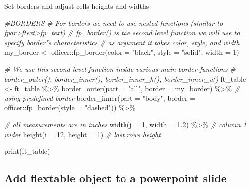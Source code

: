 \documentclass[
]{book}
\newenvironment{Shaded}{\begin{snugshade}}{\end{snugshade}}
\newcommand{\AttributeTok}[1]{\textcolor[rgb]{0.77,0.63,0.00}{#1}}
\newcommand{\CommentTok}[1]{\textcolor[rgb]{0.56,0.35,0.01}{\textit{#1}}}
\newcommand{\DecValTok}[1]{\textcolor[rgb]{0.00,0.00,0.81}{#1}}
\newcommand{\FloatTok}[1]{\textcolor[rgb]{0.00,0.00,0.81}{#1}}
\newcommand{\FunctionTok}[1]{\textcolor[rgb]{0.00,0.00,0.00}{#1}}
\newcommand{\NormalTok}[1]{#1}
\newcommand{\OtherTok}[1]{\textcolor[rgb]{0.56,0.35,0.01}{#1}}
\newcommand{\SpecialCharTok}[1]{\textcolor[rgb]{0.00,0.00,0.00}{#1}}
\newcommand{\StringTok}[1]{\textcolor[rgb]{0.31,0.60,0.02}{#1}}
\begin{document}
Set borders and adjust cells heights and widths

\begin{Shaded}
\begin{Highlighting}[]
\CommentTok{\#BORDERS}
\CommentTok{\# For borders we need to use nested functions (similar to fpar\textgreater{}ftext\textgreater{}fp\_text)}
\CommentTok{\# fp\_border() is the second level function we will use to specify border"s characteristics}
\CommentTok{\# as argument it takes color, style, and width}
\NormalTok{my\_border }\OtherTok{\textless{}{-}}\NormalTok{ officer}\SpecialCharTok{::}\FunctionTok{fp\_border}\NormalTok{(}\AttributeTok{color =} \StringTok{"black"}\NormalTok{, }\AttributeTok{style =} \StringTok{"solid"}\NormalTok{, }\AttributeTok{width =} \DecValTok{1}\NormalTok{)}

\CommentTok{\# We use this second level function inside various main border functions}
\CommentTok{\# border\_outer(), border\_inner(), border\_inner\_h(), border\_inner\_v()}
\NormalTok{ft\_table }\OtherTok{\textless{}{-}}\NormalTok{ ft\_table }\SpecialCharTok{\%\textgreater{}\%}
  \FunctionTok{border\_outer}\NormalTok{(}\AttributeTok{part =} \StringTok{"all"}\NormalTok{, }\AttributeTok{border =}\NormalTok{ my\_border) }\SpecialCharTok{\%\textgreater{}\%} \CommentTok{\# using predefined border}
  \FunctionTok{border\_inner}\NormalTok{(}\AttributeTok{part =} \StringTok{"body"}\NormalTok{, }\AttributeTok{border =}\NormalTok{ officer}\SpecialCharTok{::}\FunctionTok{fp\_border}\NormalTok{(}\AttributeTok{style =} \StringTok{"dashed"}\NormalTok{)) }\SpecialCharTok{\%\textgreater{}\%} 

  \CommentTok{\# all measurements are in inches}
  \FunctionTok{width}\NormalTok{(}\AttributeTok{j =} \DecValTok{1}\NormalTok{, }\AttributeTok{width =} \FloatTok{1.2}\NormalTok{) }\SpecialCharTok{\%\textgreater{}\%} \CommentTok{\# column 1 wider}
  \FunctionTok{height}\NormalTok{(}\AttributeTok{i =} \DecValTok{12}\NormalTok{, }\AttributeTok{height =} \DecValTok{1}\NormalTok{) }\CommentTok{\# last row\textquotesingle{}s height}

\FunctionTok{print}\NormalTok{(ft\_table)}
\end{Highlighting}
\end{Shaded}

\hypertarget{add-flextable-object-to-a-powerpoint-slide}{%
\subsection{Add flextable object to a powerpoint slide}\label{add-flextable-object-to-a-powerpoint-slide}}
\end{document}
